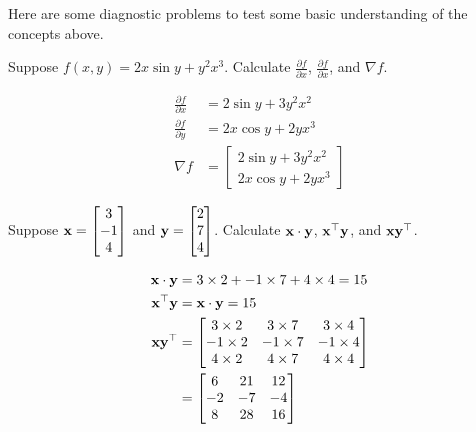 \documentclass[assignment01_Solutions]{subfiles}
\begin{document}
\begin{exercise}[(20 minutes)]
Here are some diagnostic problems to test some basic understanding of the concepts above.
\bes
\item Suppose $f(x, y) = 2x \sin{y} + y^2 x^3$.  Calculate $\frac{\partial{f}}{\partial{x}}$, $\frac{\partial{f}}{\partial{x}}$, and $\nabla f$.


\begin{boxedsolution}
\begin{align}
\frac{\partial{f}}{\partial{x}} &= 2 \sin y + 3 y^2 x^2 \\
\frac{\partial{f}}{\partial{y}} &= 2x \cos y + 2 y x^3 \\ 
\nabla f &= \begin{bmatrix} 2 \sin y + 3 y^2 x^2 \\ 2x \cos y + 2 y x^3  \end{bmatrix}
\end{align}
\end{boxedsolution}

\item Suppose $\mathbf{x} = \begin{bmatrix} 3 \\ -1 \\ 4 \end{bmatrix}$ and $\mathbf{y} = \begin{bmatrix} 2 \\  7 \\ 4 \end{bmatrix}$.  Calculate $\mathbf{x} \cdot \mathbf{y}$, $\mathbf{x}^\top \mathbf{y}$, and $\mathbf{x} \mathbf{y}^\top$.


\begin{boxedsolution}
\begin{align}
\mathbf{x} \cdot \mathbf{y} &= 3 \times 2 + -1 \times 7 + 4 \times 4 = 15 \\
\mathbf{x}^\top \mathbf{y} &= \mathbf{x} \cdot \mathbf{y} = 15 \\
\mathbf{x} \mathbf{y}^\top &= \begin{bmatrix} 3 \times 2 & 3 \times 7 & 3 \times 4 \\ -1 \times 2 & -1 \times 7 & -1 \times 4 \\ 4 \times 2 & 4 \times 7 & 4 \times 4 \end{bmatrix} \\
&= \begin{bmatrix} 6 & 21 & 12 \\ -2 & -7 & -4 \\ 8 & 28 & 16 \end{bmatrix}
\end{align}
\end{boxedsolution}


\end{exercise}
\end{document}
